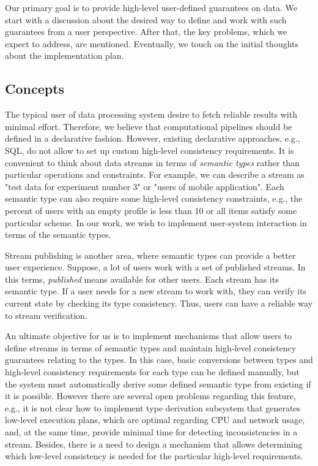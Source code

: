 \label{fs-phd-reliable}

Our primary goal is to provide high-level user-defined guarantees on data. We start with a discussion about the desired way to define and work with such guarantees from a user perspective. After that, the key problems, which we expect to address, are mentioned. Eventually, we touch on the initial thoughts about the implementation plan.

\subsection{Concepts}

The typical user of data processing system desire to fetch reliable results with minimal effort. Therefore, we believe that computational pipelines should be defined in a declarative fashion. However, existing declarative approaches, e.g., SQL, do not allow to set up custom high-level consistency requirements. It is convenient to think about data streams in terms of {\em semantic types} rather than particular operations and constraints. For example, we can describe a stream as "test data for experiment number 3" or "users of mobile application". Each semantic type can also require some high-level consistency constraints, e.g., the percent of users with an empty profile is less than 10 or all items satisfy some particular scheme. In our work, we wish to implement user-system interaction in terms of the semantic types.

Stream publishing is another area, where semantic types can provide a better user experience. Suppose, a lot of users work with a set of published streams. In this terms, {\em published} means available for other users. Each stream has its semantic type. If a user needs for a new stream to work with, they can verify its current state by checking its type consistency. Thus, users can have a reliable way to stream verification.

An ultimate objective for us is to implement mechanisms that allow users to define streams in terms of semantic types and maintain high-level consistency guarantees relating to the types. In this case, basic conversions between types and high-level consistency requirements for each type can be defined manually, but the system must automatically derive some defined semantic type from existing if it is possible. However there are several open problems regarding this feature, e.g., it is not clear how to implement type derivation subsystem that generates low-level execution plans, which are optimal regarding CPU and network usage, and, at the same time, provide minimal time for detecting inconsistencies in a stream. Besides, there is a need to design a mechanism that allows determining which low-level consistency is needed for the particular high-level requirements.  

